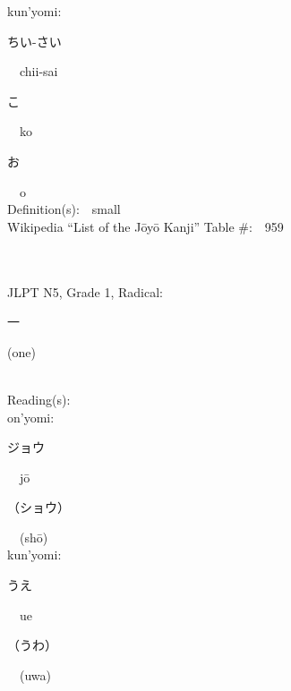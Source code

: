 \begin{multicols}{2}
{\hspace*{1em}}kun'yomi:\ \ \\
{\hspace*{2em}}{\begin{CJK}{UTF8}{min} ちい-さい \end{CJK}}\ \ chii-sai\ \ \\
{\hspace*{2em}}{\begin{CJK}{UTF8}{min} こ \end{CJK}}\ \ ko\ \ \\
{\hspace*{2em}}{\begin{CJK}{UTF8}{min} お \end{CJK}}\ \ o\ \ \\
Definition(s):\ \ small \\
Wikipedia ``List of the J\=oy\=o Kanji'' Table \#:\ \ 959 \\
\ \ \\
{\fontsize{34pt}{40pt}  }\ \ \\  %
{JLPT N5, Grade 1, Radical:\ \ {\begin{CJK}{UTF8}{min} 一 \end{CJK}} (one) } \\
Reading(s):\ \ \\
{\hspace*{1em}}on'yomi:\ \ \\
{\hspace*{2em}}{\begin{CJK}{UTF8}{min} ジョウ \end{CJK}}\ \ j\=o\ \ \\
{\hspace*{2em}}{\begin{CJK}{UTF8}{min} （ショウ） \end{CJK}}\ \ (sh\=o)\ \ \\
{\hspace*{1em}}kun'yomi:\ \ \\
{\hspace*{2em}}{\begin{CJK}{UTF8}{min} うえ \end{CJK}}\ \ ue\ \ \\
{\hspace*{2em}}{\begin{CJK}{UTF8}{min} （うわ） \end{CJK}}\ \ (uwa)\ \ \\

\end{multicols}

